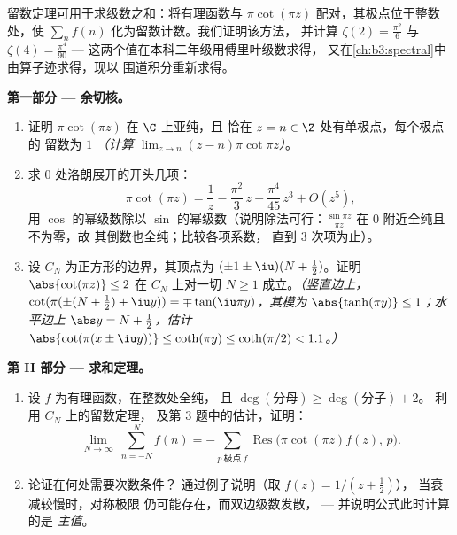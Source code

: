 \begin{problem}\label{pb:b3:residues:1}
留数定理可用于求级数之和：将有理函数与
$\pi\cot(\pi z)$ 配对，其极点位于整数处，使
$\sum_{n}f(n)$ 化为留数计数。我们证明该方法，
并计算 $\zeta(2) = \frac{\pi^2}{6}$ 与 $\zeta(4) =
\frac{\pi^4}{90}$ --- 这两个值在本科二年级用傅里叶级数求得，
又在\cref{ch:b3:spectral}中由算子迹求得，现以
围道积分重新求得。

\medskip
\noindent\textbf{第一部分 --- 余切核。}
\begin{enumerate}
  \item 证明 $\pi\cot(\pi z)$ 在 $\C$ 上亚纯，且
        恰在 $z = n \in \Z$ 处有单极点，每个极点的
        留数为 $1$ \emph{（计算
        $\lim_{z\to n}(z-n)\pi\cot\pi z$）}。
  \item 求 $0$ 处洛朗展开的开头几项：
        \[
        \pi\cot(\pi z) = \frac1z - \frac{\pi^2}{3}\,z -
        \frac{\pi^4}{45}\,z^3 + O(z^5) ,
        \]
        用 $\cos$ 的幂级数除以
        $\sin$ 的幂级数（说明除法可行：$\frac{\sin\pi z}{\pi z}$
        在 $0$ 附近全纯且不为零，故
        其倒数也全纯；比较各项系数，
        直到 $3$ 次项为止）。
  \item 设 $C_N$ 为正方形的边界，其顶点为
        $(\pm1\pm\iu)(N + \frac12)$。证明
        $\abs{\cot(\pi z)} \leq 2$ 在 $C_N$ 上对一切 $N \geq
        1$ 成立。\emph{（竖直边上，$\cot(\pi(\pm(N +
        \frac12) + \iu y)) = \mp\tan(\iu\pi y)$，其模为
        $\abs{\tanh(\pi y)} \leq 1$；水平边上
        $\abs y = N + \frac12$，估计
        $\abs{\cot(\pi(x\pm\iu y))} \leq \coth(\pi y) \leq
        \coth(\pi/2) < 1.1$。）}
\end{enumerate}

\medskip
\noindent\textbf{第 II 部分 --- 求和定理。}
\begin{enumerate}[resume]
  \item 设 $f$ 为有理函数，在整数处全纯，
        且 $\deg(\text{分母}) \geq \deg(\text{分子}) + 2$。
        利用 $C_N$ 上的留数定理，
        及第 3 题中的估计，证明：
        \[
        \lim_{N\to\infty}\ \sum_{n = -N}^{N} f(n)
        = -\sum_{p\ \text{极点}\ f}
        \operatorname{Res}\bigl(\pi\cot(\pi z)f(z),\,p\bigr).
        \]
  \item 论证在何处需要次数条件？
        通过例子说明（取 $f(z) = 1/(z + \frac12)$），
        当衰减较慢时，对称极限
        仍可能存在，而双边级数发散，
        --- 并说明公式此时计算的是
        \emph{主值}。
\end{enumerate}


\end{problem}
